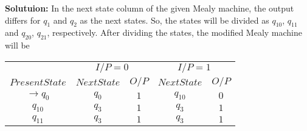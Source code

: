 \documentclass{article}
\begin{document}
\vspace*{0.3cm}

\textbf{Solutuion:} In the next state column of the given Mealy machine, the output differs for $q_1$ and $q_2$
as the next states. So, the states will be divided as $q_10$, $q_11$ and $q_20$, $q_21$, respectively. After dividing
the states, the modified Mealy machine will be\\

\vspace*{0.3cm}
\begin{center}
\begin{tabular}{ccccc}
 \hline

 \hline

 \hline

 \hline
 &  \multicolumn{2}{c}{$I/P = 0$ } &  \multicolumn{2}{c}{$I/P = 1$}  \\
  \cline{2-3}                         \cline{4-5}
 $Present State$ &   $Next State$  & $O/P$ &  $Next State$  & $O/P$\\
\hline
$\rightarrow q_0$  &  $q_0$    &  $1$  &  $q_10$  & $0$ \\
$q_10$             &  $q_3$    &  $1$  &  $q_3$   & $1$ \\
$q_11$             &  $q_3$    &  $1$  &  $q_3$   & $1$ \\
 \hline
\end{tabular}
\end{center}
\end{document}
